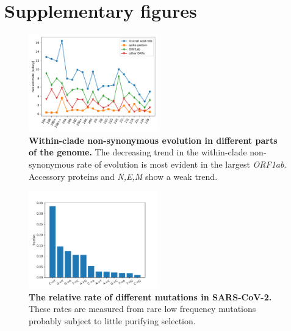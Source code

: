 \section*{Supplementary figures}

\setcounter{figure}{0}
\renewcommand{\figurename}{Figure S}
\setcounter{table}{0}
\renewcommand{\tablename}{Table S}

\begin{figure}[h]
    \includegraphics[width=0.5\textwidth]{figures/rate_progression_by_gene.pdf}
    \caption{{\bf Within-clade non-synonymous evolution in different parts of the genome.}
    The decreasing trend in the within-clade non-synonymous rate of evolution is most evident in the largest \emph{ORF1ab}.
    Accessory proteins and \emph{N,E,M} show a weak trend.
    \label{fig:rate_progression_by_gene}}
\end{figure}

\begin{figure}[h]
    \includegraphics[width=0.5\textwidth]{figures/mutation_distribution.pdf}
    \caption{{\bf The relative rate of different mutations in SARS-CoV-2.}
    These rates are measured from rare low frequency mutations probably subject to little purifying selection.
    \label{fig:mutation_distribution}}
\end{figure}

